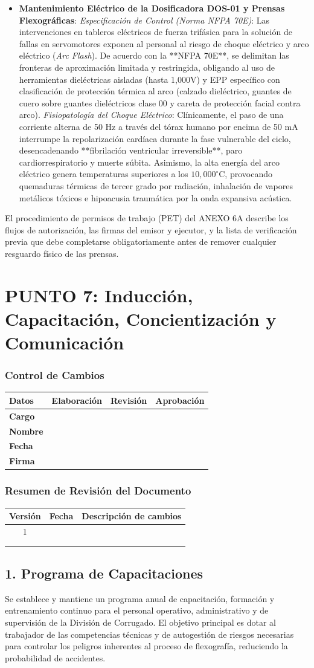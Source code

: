 \documentclass[11pt, letterpaper]{article}
\newcommand{\controlcambios}{
    \subsubsection*{Control de Cambios}
    \begin{table}[H]
        \centering
        \small
        \begin{tabular}{lp{4cm}p{4cm}p{4cm}}
            \toprule
            \textbf{Datos} & \textbf{Elaboración} & \textbf{Revisión} & \textbf{Aprobación} \\
            \midrule
            \textbf{Cargo} & & & \\
            \textbf{Nombre} & & & \\
            \textbf{Fecha} & & & \\
            \textbf{Firma} & & & \\
            \bottomrule
        \end{tabular}
    \end{table}
}
\newcommand{\resumenrevision}[1]{
    \subsubsection*{Resumen de Revisión del Documento}
    \begin{table}[H]
        \centering
        \small
        \begin{tabular}{ccp{8cm}}
            \toprule
            \textbf{Versión} & \textbf{Fecha} & \textbf{Descripción de cambios} \\
            \midrule
            #1 & & \\
            & & \\
            & & \\
            \bottomrule
        \end{tabular}
    \end{table}
}
\begin{document}
\begin{itemize}
    \item \textbf{Mantenimiento Eléctrico de la Dosificadora DOS-01 y Prensas Flexográficas}:
    \textit{Especificación de Control (Norma NFPA 70E)}: Las intervenciones en tableros eléctricos de fuerza trifásica para la solución de fallas en servomotores exponen al personal al riesgo de choque eléctrico y arco eléctrico (\textit{Arc Flash}). De acuerdo con la **NFPA 70E**, se delimitan las fronteras de aproximación limitada y restringida, obligando al uso de herramientas dieléctricas aisladas (hasta 1,000V) y EPP específico con clasificación de protección térmica al arco (calzado dieléctrico, guantes de cuero sobre guantes dieléctricos clase 00 y careta de protección facial contra arco).
    \textit{Fisiopatología del Choque Eléctrico}: Clínicamente, el paso de una corriente alterna de 50 Hz a través del tórax humano por encima de 50 mA interrumpe la repolarización cardíaca durante la fase vulnerable del ciclo, desencadenando **fibrilación ventricular irreversible**, paro cardiorrespiratorio y muerte súbita. Asimismo, la alta energía del arco eléctrico genera temperaturas superiores a los $10,000^{\circ}$C, provocando quemaduras térmicas de tercer grado por radiación, inhalación de vapores metálicos tóxicos e hipoacusia traumática por la onda expansiva acústica.
\end{itemize}

El procedimiento de permisos de trabajo (PET) del ANEXO 6A describe los flujos de autorización, las firmas del emisor y ejecutor, y la lista de verificación previa que debe completarse obligatoriamente antes de remover cualquier resguardo físico de las prensas.
\newpage
\section{PUNTO 7: Inducción, Capacitación, Concientización y Comunicación}
\controlcambios
\resumenrevision{1}
\subsection{1. Programa de Capacitaciones}
Se establece y mantiene un programa anual de capacitación, formación y entrenamiento continuo para el personal operativo, administrativo y de supervisión de la División de Corrugado. El objetivo principal es dotar al trabajador de las competencias técnicas y de autogestión de riesgos necesarias para controlar los peligros inherentes al proceso de flexografía, reduciendo la probabilidad de accidentes.
\end{document}
